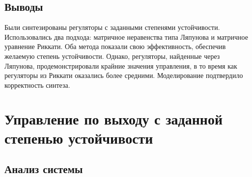 \subsection{Выводы}

Были синтезированы регуляторы с заданными степенями устойчивости. 
Использовались два подхода: матричное неравенства типа Ляпунова и 
матричное уравнение Риккати. Оба метода показали свою эффективность, обеспечив желаемую 
степень устойчивости. Однако, регуляторы, найденные через Ляпунова, продемонстрировали 
крайние значения управления, в то время как регуляторы из Риккати оказались более 
средними. Моделирование подтвердило корректность синтеза.





\section{Управление по выходу с заданной степенью устойчивости}

\subsection{Анализ системы}

